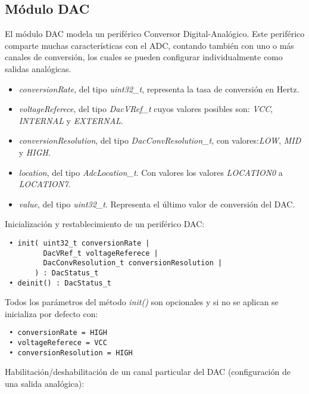 \subsection{Módulo DAC}

El módulo DAC modela un periférico Conversor Digital-Analógico. Este periférico comparte muchas características con el ADC, contando también con uno o más canales de conversión, los cuales se pueden configurar individualmente como salidas analógicas.


\begin{itemize}
\item
\emph{conversionRate}, del tipo \emph{uint32\_t}, representa la tasa de conversión en Hertz.
\item
\emph{voltageReferece}, del tipo \emph{DacVRef\_t} cuyos valores posibles son: \emph{VCC}, \emph{INTERNAL} y \emph{EXTERNAL}.
\item
\emph{conversionResolution}, del tipo \emph{DacConvResolution\_t}, con valores:\emph{LOW}, \emph{MID} y \emph{HIGH}.
\item
\emph{location}, del tipo \emph{AdcLocation\_t}. Con valores los valores \emph{LOCATION0} a \emph{LOCATION7}.
\item
\emph{value}, del tipo \emph{uint32\_t}. Representa el último valor de conversión del DAC.
\end{itemize}


Inicialización y restablecimiento de un periférico DAC:

\begin{verbatim}
 • init( uint32_t conversionRate | 
         DacVRef_t voltageReferece |
         DacConvResolution_t conversionResolution |
       ) : DacStatus_t
 • deinit() : DacStatus_t
\end{verbatim}

Todos los parámetros del método \emph{init()} son opcionales y si no se aplican se inicializa por defecto con:

\begin{verbatim}
 • conversionRate = HIGH
 • voltageReferece = VCC
 • conversionResolution = HIGH
\end{verbatim}

Habilitación/deshabilitación de un canal particular del DAC (configuración de una salida analógica):

